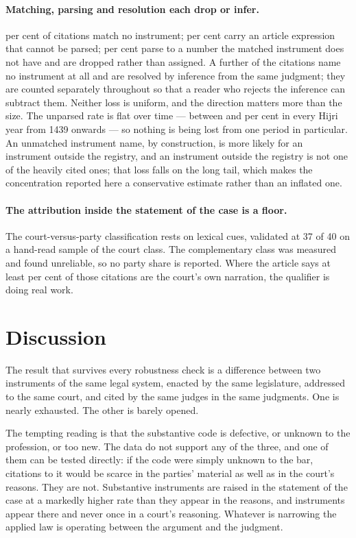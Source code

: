 \documentclass[11pt]{article}
\begin{document}
\paragraph{Matching, parsing and resolution each drop or infer.}
\nUnmatchedShare{} per cent of citations match no instrument;
\nUnparsedShare{} per cent carry an article expression that cannot be parsed;
\nOutOfRangeShare{} per cent parse to a number the matched instrument does
not have and are dropped rather than assigned. A further \nAnaphoric{} of
the \nCitations{} citations name no instrument at all and are resolved by
inference from the same judgment; they are counted separately throughout
so that a reader who rejects the inference can subtract them. Neither loss is
uniform, and the direction matters more than the size. The unparsed rate is
flat over time --- between \nUnparsedYearMin{} and \nUnparsedYearMax{} per
cent in every Hijri year from 1439 onwards --- so nothing is being lost from
one period in particular. An unmatched instrument name, by construction, is
more likely for an instrument outside the registry, and an instrument outside
the registry is not one of the heavily cited ones; that loss falls on the
long tail, which makes the concentration reported here a conservative
estimate rather than an inflated one.

\paragraph{The attribution inside the statement of the case is a floor.} The
court-versus-party classification rests on lexical cues, validated at 37 of
40 on a hand-read sample of the court class. The complementary class was
measured and found unreliable, so no party share is reported. Where the
article says at least \nRecitalByCourtShare{} per cent of those citations are
the court's own narration, the qualifier is doing real work.

\section{Discussion}
\label{sec:discussion}

The result that survives every robustness check is a difference between two
instruments of the same legal system, enacted by the same legislature,
addressed to the same court, and cited by the same judges in the same
judgments. One is nearly exhausted. The other is barely opened.

The tempting reading is that the substantive code is defective, or unknown to
the profession, or too new. The data do not support any of the three, and one
of them can be tested directly: if the code were simply unknown to the bar,
citations to it would be scarce in the parties' material as well as in the
court's reasons. They are not. Substantive instruments are raised in the
statement of the case at a markedly higher rate than they appear in the
reasons, and \nRecitalOnlyInstruments{} instruments appear there and never
once in a court's reasoning. Whatever is narrowing the applied law is
operating between the argument and the judgment.
\end{document}
